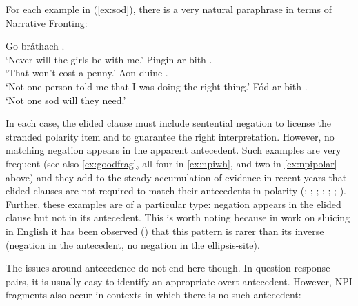 \documentclass[output=paper,colorlinks,citecolor=brown]{langscibook}
\begin{document}
\noindent For each example in (\ref{ex:sod}), there is a very natural paraphrase in terms of Narrative Fronting:

\ea
\ea
Go bráthach . \\
`Never will the girls be with me.'
\ex
Pingin ar bith . \\
`That won't cost a penny.' 
\ex
Aon duine . \\
`Not one person told me that I was doing the right thing.'
\ex
Fód ar bith . \\
`Not one sod will they need.'
\z
\z


\noindent In each case, the elided clause must include sentential negation to license the stranded polarity item and to guarantee the right interpretation. However, no matching negation appears in the apparent antecedent.  Such examples are very frequent (see also \ref{ex:goodfrag}, all four in \ref{ex:npiwh}, and two in \ref{ex:npipolar} above) and they add to the steady accumulation of evidence in recent years that elided clauses are not required to match their antecedents in polarity (\cite{yoshida:10}; \cite{maziar:13}; \cite{deniz-margaret}; \cite{rudin:18}; \cite{kroll:18}; \cite{ahm:20}; \cite{ranero:21}). Further, these examples are of a particular type: negation appears in the elided clause but not in its antecedent. This is worth noting because in work on sluicing in English it has been observed (\cite{ahm:20}) that this pattern is rarer than its inverse (negation in the antecedent, no negation in the ellipsis-site).

The issues around antecedence do not end here though.  In question-response pairs, it is usually easy to identify an appropriate overt antecedent. However, NPI fragments also occur in contexts in which there is no such antecedent:
\end{document}
